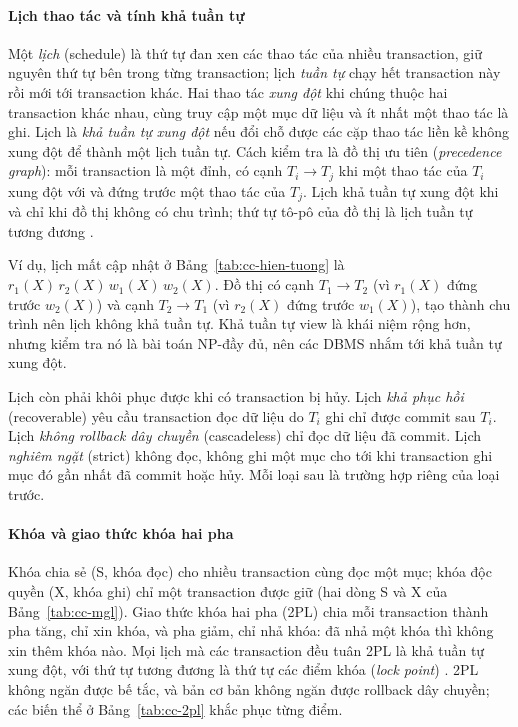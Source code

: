 \paragraph{Lịch thao tác và tính khả tuần tự}
Một \emph{lịch} (schedule) là thứ tự đan xen các thao tác của nhiều transaction, giữ nguyên thứ tự bên trong từng transaction; lịch \emph{tuần tự} chạy hết transaction này rồi mới tới transaction khác. Hai thao tác \emph{xung đột} khi chúng thuộc hai transaction khác nhau, cùng truy cập một mục dữ liệu và ít nhất một thao tác là ghi. Lịch là \emph{khả tuần tự xung đột} nếu đổi chỗ được các cặp thao tác liền kề không xung đột để thành một lịch tuần tự. Cách kiểm tra là đồ thị ưu tiên (\emph{precedence graph}): mỗi transaction là một đỉnh, có cạnh $T_i \rightarrow T_j$ khi một thao tác của $T_i$ xung đột với và đứng trước một thao tác của $T_j$. Lịch khả tuần tự xung đột khi và chỉ khi đồ thị không có chu trình; thứ tự tô-pô của đồ thị là lịch tuần tự tương đương \cite{cc-silberschatz2019, cc-elmasri2016}.

Ví dụ, lịch mất cập nhật ở Bảng~\ref{tab:cc-hien-tuong} là $r_1(X)\, r_2(X)\, w_1(X)\, w_2(X)$. Đồ thị có cạnh $T_1 \rightarrow T_2$ (vì $r_1(X)$ đứng trước $w_2(X)$) và cạnh $T_2 \rightarrow T_1$ (vì $r_2(X)$ đứng trước $w_1(X)$), tạo thành chu trình nên lịch không khả tuần tự. Khả tuần tự view là khái niệm rộng hơn, nhưng kiểm tra nó là bài toán NP-đầy đủ, nên các DBMS nhắm tới khả tuần tự xung đột.

Lịch còn phải khôi phục được khi có transaction bị hủy. Lịch \emph{khả phục hồi} (recoverable) yêu cầu transaction đọc dữ liệu do $T_i$ ghi chỉ được commit sau $T_i$. Lịch \emph{không rollback dây chuyền} (cascadeless) chỉ đọc dữ liệu đã commit. Lịch \emph{nghiêm ngặt} (strict) không đọc, không ghi một mục cho tới khi transaction ghi mục đó gần nhất đã commit hoặc hủy. Mỗi loại sau là trường hợp riêng của loại trước.

\paragraph{Khóa và giao thức khóa hai pha}
Khóa chia sẻ (S, khóa đọc) cho nhiều transaction cùng đọc một mục; khóa độc quyền (X, khóa ghi) chỉ một transaction được giữ (hai dòng S và X của Bảng~\ref{tab:cc-mgl}). Giao thức khóa hai pha (2PL) chia mỗi transaction thành pha tăng, chỉ xin khóa, và pha giảm, chỉ nhả khóa: đã nhả một khóa thì không xin thêm khóa nào. Mọi lịch mà các transaction đều tuân 2PL là khả tuần tự xung đột, với thứ tự tương đương là thứ tự các điểm khóa (\emph{lock point}) \cite{cc-silberschatz2019}. 2PL không ngăn được bế tắc, và bản cơ bản không ngăn được rollback dây chuyền; các biến thể ở Bảng~\ref{tab:cc-2pl} khắc phục từng điểm.

